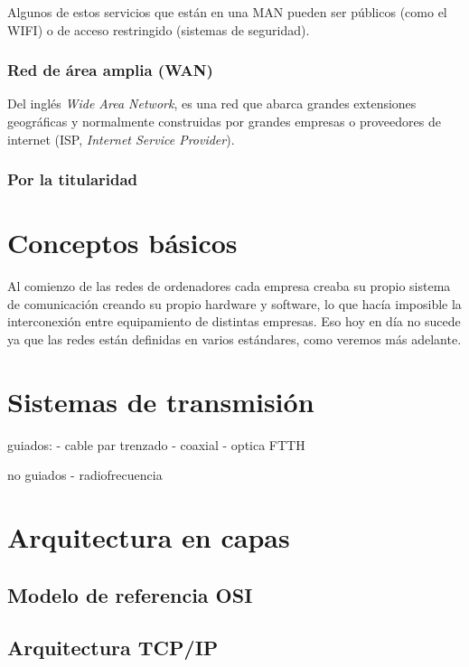 Algunos de estos servicios que están en una MAN pueden ser públicos (como el WIFI) o de acceso restringido (sistemas de seguridad).

\subsubsection{Red de área amplia (WAN)}
Del inglés \textit{Wide Area Network}, es una red que abarca grandes extensiones geográficas y normalmente construidas por grandes empresas o proveedores de internet (ISP, \textit{Internet Service Provider}).


\subsubsection{Por la titularidad}





\section{Conceptos básicos}
Al comienzo de las redes de ordenadores cada empresa creaba su propio sistema de comunicación creando su propio hardware y software, lo que hacía imposible la interconexión entre equipamiento de distintas empresas. Eso hoy en día no sucede ya que las redes están definidas en varios estándares, como veremos más adelante.


\hypertarget{sistemas_transmision}{}
\section{Sistemas de transmisión}

guiados:
 - cable par trenzado
 - coaxial
 - optica
   FTTH

no guiados
 - radiofrecuencia



\section{Arquitectura en capas}



\subsection{Modelo de referencia OSI}


\subsection{Arquitectura TCP/IP}





